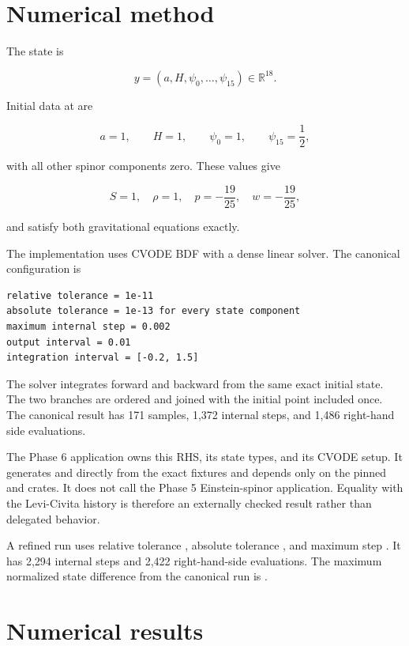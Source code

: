 \documentclass[11pt]{article}
\begin{document}
\section{Numerical method}

The state is

\[
y=(a,H,\psi_0,\ldots,\psi_{15})\in\mathbb R^{18}.
\]

Initial data at \texttt{} are

\[
a=1,
\qquad H=1,
\qquad \psi_0=1,
\qquad \psi_{15}=\frac12,
\]

with all other spinor components zero. These values give

\[
S=1,
\quad \rho=1,
\quad p=-\frac{19}{25},
\quad w=-\frac{19}{25},
\]

and satisfy both gravitational equations exactly.

The implementation uses CVODE BDF with a dense linear solver. The canonical configuration is

\begin{Verbatim}[fontsize=\small]
relative tolerance = 1e-11
absolute tolerance = 1e-13 for every state component
maximum internal step = 0.002
output interval = 0.01
integration interval = [-0.2, 1.5]
\end{Verbatim}

The solver integrates forward and backward from the same exact initial state. The two branches are ordered and joined with the initial point included once. The canonical result has 171 samples, 1,372 internal steps, and 1,486 right-hand side evaluations.

The Phase 6 application owns this RHS, its state types, and its CVODE setup. It generates \texttt{} and \texttt{} directly from the exact fixtures and depends only on the pinned \texttt{} and \texttt{} crates. It does not call the Phase 5 Einstein-spinor application. Equality with the Levi-Civita history is therefore an externally checked result rather than delegated behavior.

A refined run uses relative tolerance \texttt{}, absolute tolerance \texttt{}, and maximum step \texttt{}. It has 2,294 internal steps and 2,422 right-hand-side evaluations. The maximum normalized state difference from the canonical run is \texttt{}.

\section{Numerical results}
\end{document}
